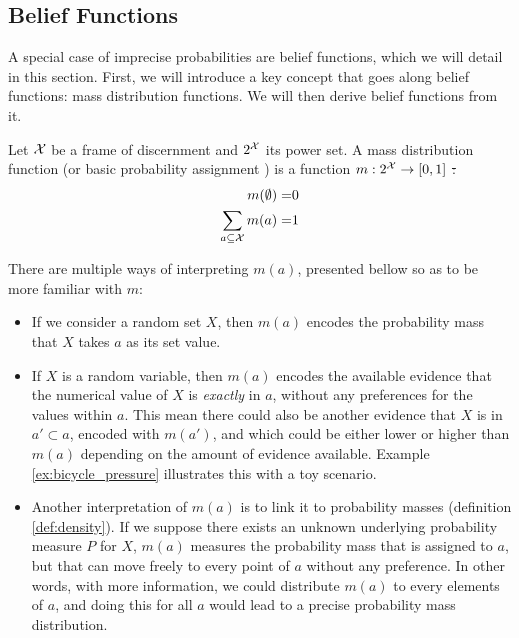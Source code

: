\subsection{Belief Functions}\label{sec:belief_functions}
A special case of imprecise probabilities are belief functions, which we will detail in this section. First, we will introduce a key concept that goes along belief functions: mass distribution functions. We will then derive belief functions from it.

\begin{definition}\label{def:mass_distribution_function}
    Let ${\mathcal{X}}$ be a frame of discernment and $2^{\mathcal{X}}$ its power set. A mass distribution function (or basic probability assignment \cite{shafer_mathematical_1976}) is a function $m:2^{\mathcal{X}}\rightarrow[0,1]$ \st:
    \begin{align}
        m(\emptyset) =& 0\label{eq:mass_emptyset}\\
        \sum_{a\subseteq{\mathcal{X}}}m(a) =& 1\label{eq:mass_whole_set}
    \end{align}
\end{definition}

There are multiple ways of interpreting $m(a)$, presented bellow so as to be more familiar with $m$:
\begin{itemize}
    \item If we consider a random set $X$, then $m(a)$ encodes the probability mass that $X$ takes $a$ as its set value.
    \item If $X$ is a random variable, then $m(a)$ encodes the available evidence that the numerical value of $X$ is \textit{exactly} in $a$, without any preferences for the values within $a$. This mean there could also be another evidence that $X$ is in $a'\subset a$, encoded with $m(a')$, and which could be either lower or higher than $m(a)$ depending on the amount of evidence available. Example \ref{ex:bicycle_pressure} illustrates this with a toy scenario. 
    \item Another interpretation of $m(a)$ is to link it to probability masses (definition \ref{def:density}). If we suppose there exists an unknown underlying probability measure $P$ for $X$, $m(a)$ measures the probability mass that is assigned to $a$, but that can move freely to every point of $a$ without any preference. In other words, with more information, we could distribute $m(a)$ to every elements of $a$, and doing this for all $a$ would lead to a precise probability mass distribution.
\end{itemize}

